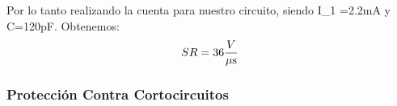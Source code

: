Por lo tanto realizando la cuenta para nuestro circuito, siendo I\_1 =2.2mA y C=120pF. Obtenemos:
$$ SR=36\dfrac{V}{\mu\mbox{s}} $$



\bigskip
\subsubsection{Protección Contra Cortocircuitos}\label{contra_cortos} 